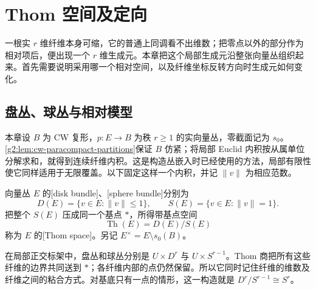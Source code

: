 
% 
% 

\section{Thom 空间及定向}
\label{g2:sec:2001}

一根实 \(r\) 维纤维本身可缩，它的普通上同调看不出维数；把零点以外的部分作为相对项后，便出现一个 \(r\) 维生成元。本章把这个局部生成元沿整张向量丛组织起来。首先需要说明采用哪一个相对空间，以及纤维坐标反转方向时生成元如何变化。

\subsection{盘丛、球丛与相对模型}
\label{g2:subsec:2001:01}
本章设 \(B\) 为 CW 复形，\(p:E\to B\) 为秩 \(r\ge1\) 的实向量丛，零截面记为 \(s_0\)。\cref{g2:lem:cw-paracompact-partitions}保证 \(B\) 仿紧；将局部 Euclid 内积按从属单位分解求和，就得到连续纤维内积。这是构造丛嵌入时已经使用的方法，局部有限性使它同样适用于无限覆盖。以下固定这样一个内积，并记 \(\|v\|\) 为相应范数。

\begin{definition}\label{g2:def:disk-sphere-thom}
	向量丛 \(E\) 的[disk bundle]、[sphere bundle]分别为
	\[
		D(E)=\{v\in E:\|v\|\le1\},\qquad S(E)=\{v\in E:\|v\|=1\}.
	\]
	把整个 \(S(E)\) 压成同一个基点 \(*\)，所得带基点空间
	\[
		\operatorname{Th}(E)=D(E)/S(E)
	\]
	称为 \(E\) 的[Thom space]。另记 \(E^\times=E\setminus s_0(B)\)。
\end{definition}

在局部正交标架中，盘丛和球丛分别是 \(U\times D^r\) 与 \(U\times S^{r-1}\)。Thom 商把所有这些纤维的边界共同送到 \(*\)；各纤维内部的点仍然保留。所以它同时记住纤维的维数及纤维之间的粘合方式。对基底只有一点的情形，这一构造就是 \(D^r/S^{r-1}\cong S^r\)。

